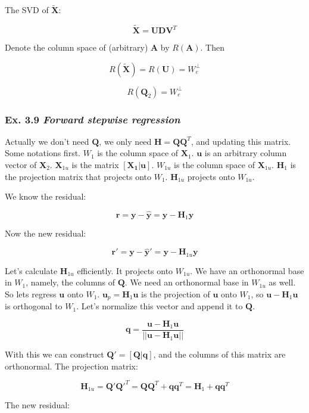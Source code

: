 \documentclass{article}
\begin{document}
The SVD of $\tilde{\bm{X}}$:

\[
\tilde{\bm{X}} = \bm{U} \bm{D} \bm{V}^{T}
\]

Denote the column space of (arbitrary) $\bm{A}$ by $R(\bm{A})$. Then

\[
R(\tilde{\bm{X}}) = R(\bm{U}) = W_e^{\perp}
\]

\[
R(\bm{Q}_2) = W_e^{\perp}
\]


\subsubsection{Ex. 3.9 \emph{Forward stepwise regression}}

Actually we don't need $\mathbf{Q}$, we only need $\mathbf{H}= \mathbf{Q}\mathbf{Q}^T$, and updating this matrix. Some notations first. $W_1$ is the column space of $\mathbf{X}_1$. $\mathbf{u}$ is an arbitrary column vector of $\mathbf{X}_2$. $\mathbf{X}_{1u}$ is the matrix $[\mathbf{X_1} | \mathbf{u}]$. $W_{1u}$ is the column space of $\mathbf{X}_{1u}$. $\mathbf{H}_1$ is the projection matrix that projects onto $W_1$. $\mathbf{H}_{1u}$ projects onto $W_{1u}$.

We know the residual:

\[
\mathbf{r} = \mathbf{y} - \mathbf{\hat{y}} = \mathbf{y} - \mathbf{H}_1 \mathbf{y}
\]

Now the new residual:

\[
\mathbf{r}'  = \mathbf{y} - \mathbf{\hat{y}}' = \mathbf{y} - \mathbf{H}_{1u}\mathbf{y}
\]

Let's calculate $\mathbf{H}_{1u}$ efficiently. It projects onto $W_{1u}$. We have an orthonormal base in $W_1$, namely, the columns of $\mathbf{Q}$. We need an orthonormal base in $W_{1u}$ as well. So lets regress $\mathbf{u}$ onto $W_1$. $\mathbf{u}_p = \mathbf{H}_1 \mathbf{u}$ is the projection of $\mathbf{u}$ onto $W_1$, so $\mathbf{u} - \mathbf{H}_1 \mathbf{u}$ is orthogonal to $W_1$. Let's normalize this vector and append it to $\mathbf{Q}$.

\[
    \mathbf{q} = \frac{\mathbf{u} - \mathbf{H}_1 \mathbf{u}}{|| \mathbf{u} - \mathbf{H}_1 \mathbf{u} ||}
\]

With this we can construct $\mathbf{Q}' = [\mathbf{Q} | \mathbf{q}]$, and the columns of this matrix are orthonormal. The projection matrix:

\[
\mathbf{H}_{1u} = \mathbf{Q}'\mathbf{Q}'^T = \mathbf{Q}\mathbf{Q}^T + \mathbf{q}\mathbf{q}^T = \mathbf{H}_1 + \mathbf{q}\mathbf{q}^T
\]

The new residual:
\end{document}
